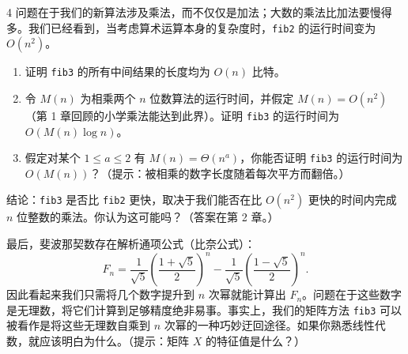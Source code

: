 \begin{exercise}{4}
问题在于我们的新算法涉及乘法，而不仅仅是加法；大数的乘法比加法要慢得多。我们已经看到，当考虑算术运算本身的复杂度时，\texttt{fib2} 的运行时间变为 $O(n^2)$。
\begin{enumerate}
    \item[(c)] 证明 \texttt{fib3} 的所有中间结果的长度均为 $O(n)$ 比特。
    \item[(d)] 令 $M(n)$ 为相乘两个 $n$ 位数算法的运行时间，并假定 $M(n) = O(n^2)$（第 1 章回顾的小学乘法能达到此界）。证明 \texttt{fib3} 的运行时间为 $O(M(n) \log n)$。
    \item[(e)] 假定对某个 $1 \le a \le 2$ 有 $M(n) = \Theta(n^a)$，你能否证明 \texttt{fib3} 的运行时间为 $O(M(n))$？（提示：被相乘的数字长度随着每次平方而翻倍。）
\end{enumerate}
结论：\texttt{fib3} 是否比 \texttt{fib2} 更快，取决于我们能否在比 $O(n^2)$ 更快的时间内完成 $n$ 位整数的乘法。你认为这可能吗？（答案在第 2 章。）

最后，斐波那契数存在解析通项公式（比奈公式）：
\[
F_n = \frac{1}{\sqrt{5}} \left( \frac{1 + \sqrt{5}}{2} \right)^n - \frac{1}{\sqrt{5}} \left( \frac{1 - \sqrt{5}}{2} \right)^n.
\]
因此看起来我们只需将几个数字提升到 $n$ 次幂就能计算出 $F_n$。问题在于这些数字是无理数，将它们计算到足够精度绝非易事。事实上，我们的矩阵方法 \texttt{fib3} 可以被看作是将这些无理数自乘到 $n$ 次幂的一种巧妙迂回途径。如果你熟悉线性代数，就应该明白为什么。（提示：矩阵 $X$ 的特征值是什么？）
\end{exercise}
